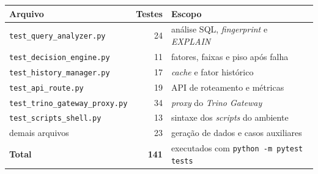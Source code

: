\begin{center}
\footnotesize
\begin{tabular}{lrl}
\hline
\textbf{Arquivo} & \textbf{Testes} & \textbf{Escopo} \\
\hline
\texttt{test\_query\_analyzer.py} & 24 & análise SQL, \textit{fingerprint} e \textit{EXPLAIN} \\
\texttt{test\_decision\_engine.py} & 11 & fatores, faixas e piso após falha \\
\texttt{test\_history\_manager.py} & 17 & \textit{cache} e fator histórico \\
\texttt{test\_api\_route.py} & 19 & API de roteamento e métricas \\
\texttt{test\_trino\_gateway\_proxy.py} & 34 & \textit{proxy} do \textit{Trino Gateway} \\
\texttt{test\_scripts\_shell.py} & 13 & sintaxe dos \textit{scripts} do ambiente \\
demais arquivos & 23 & geração de dados e casos auxiliares \\
\hline
\textbf{Total} & \textbf{141} & executados com \texttt{python -m pytest tests} \\
\hline
\end{tabular}
\end{center}

